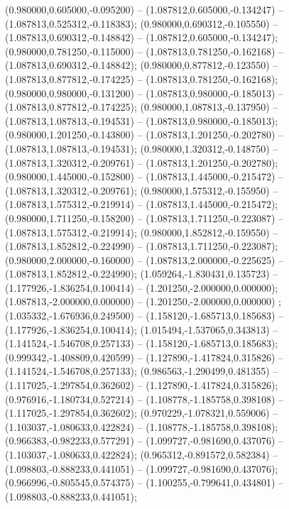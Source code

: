  (0.980000,0.605000,-0.095200) -- (1.087812,0.605000,-0.134247) -- (1.087813,0.525312,-0.118383);
 (0.980000,0.690312,-0.105550) -- (1.087813,0.690312,-0.148842) -- (1.087812,0.605000,-0.134247);
 (0.980000,0.781250,-0.115000) -- (1.087813,0.781250,-0.162168) -- (1.087813,0.690312,-0.148842);
 (0.980000,0.877812,-0.123550) -- (1.087813,0.877812,-0.174225) -- (1.087813,0.781250,-0.162168);
 (0.980000,0.980000,-0.131200) -- (1.087813,0.980000,-0.185013) -- (1.087813,0.877812,-0.174225);
 (0.980000,1.087813,-0.137950) -- (1.087813,1.087813,-0.194531) -- (1.087813,0.980000,-0.185013);
 (0.980000,1.201250,-0.143800) -- (1.087813,1.201250,-0.202780) -- (1.087813,1.087813,-0.194531);
 (0.980000,1.320312,-0.148750) -- (1.087813,1.320312,-0.209761) -- (1.087813,1.201250,-0.202780);
 (0.980000,1.445000,-0.152800) -- (1.087813,1.445000,-0.215472) -- (1.087813,1.320312,-0.209761);
 (0.980000,1.575312,-0.155950) -- (1.087813,1.575312,-0.219914) -- (1.087813,1.445000,-0.215472);
 (0.980000,1.711250,-0.158200) -- (1.087813,1.711250,-0.223087) -- (1.087813,1.575312,-0.219914);
 (0.980000,1.852812,-0.159550) -- (1.087813,1.852812,-0.224990) -- (1.087813,1.711250,-0.223087);
 (0.980000,2.000000,-0.160000) -- (1.087813,2.000000,-0.225625) -- (1.087813,1.852812,-0.224990);
 (1.059264,-1.830431,0.135723) -- (1.177926,-1.836254,0.100414) -- (1.201250,-2.000000,0.000000);
 (1.087813,-2.000000,0.000000) -- (1.201250,-2.000000,0.000000) ;
 (1.035332,-1.676936,0.249500) -- (1.158120,-1.685713,0.185683) -- (1.177926,-1.836254,0.100414);
 (1.015494,-1.537065,0.343813) -- (1.141524,-1.546708,0.257133) -- (1.158120,-1.685713,0.185683);
 (0.999342,-1.408809,0.420599) -- (1.127890,-1.417824,0.315826) -- (1.141524,-1.546708,0.257133);
 (0.986563,-1.290499,0.481355) -- (1.117025,-1.297854,0.362602) -- (1.127890,-1.417824,0.315826);
 (0.976916,-1.180734,0.527214) -- (1.108778,-1.185758,0.398108) -- (1.117025,-1.297854,0.362602);
 (0.970229,-1.078321,0.559006) -- (1.103037,-1.080633,0.422824) -- (1.108778,-1.185758,0.398108);
 (0.966383,-0.982233,0.577291) -- (1.099727,-0.981690,0.437076) -- (1.103037,-1.080633,0.422824);
 (0.965312,-0.891572,0.582384) -- (1.098803,-0.888233,0.441051) -- (1.099727,-0.981690,0.437076);
 (0.966996,-0.805545,0.574375) -- (1.100255,-0.799641,0.434801) -- (1.098803,-0.888233,0.441051);

